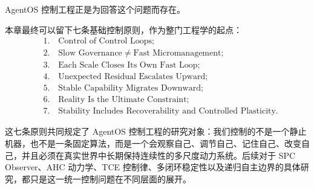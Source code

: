 AgentOS 控制工程正是为回答这个问题而存在。

本章最终可以留下七条基础控制原则，作为整门工程学的起点：
\[
\boxed{
\begin{aligned}
&1.\quad
\text{Control of Control Loops};\\
&2.\quad
\text{Slow Governance}\neq\text{Fast Micromanagement};\\
&3.\quad
\text{Each Scale Closes Its Own Fast Loop};\\
&4.\quad
\text{Unexpected Residual Escalates Upward};\\
&5.\quad
\text{Stable Capability Migrates Downward};\\
&6.\quad
\text{Reality Is the Ultimate Constraint};\\
&7.\quad
\text{Stability Includes Recoverability and Controlled Plasticity}.
\end{aligned}
}
\]

这七条原则共同规定了 AgentOS 控制工程的研究对象：我们控制的不是一个静止机器，也不是一条固定算法，而是一个会观察自己、调节自己、记住自己、改变自己，并且必须在真实世界中长期保持连续性的多尺度动力系统。后续对于 SPC Observer、AHC 动力学、TCE 控制律、多闭环稳定性以及递归自主边界的具体研究，都只是这一统一控制问题在不同层面的展开。
